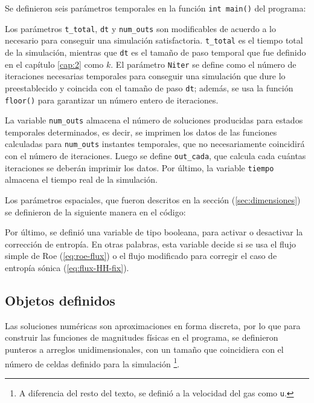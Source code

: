 

Se definieron seis parámetros temporales en la función \texttt{int main()} del programa:


Los parámetros \texttt{t\_total}, \texttt{dt} y \texttt{num\_outs} son modificables de acuerdo a lo necesario para conseguir una simulación satisfactoria. \texttt{t\_total} es el tiempo total de la simulación, mientras que \texttt{dt} es el tamaño de paso temporal que fue definido en el capítulo \ref{cap:2} como $k$. El parámetro \texttt{Niter} se define como el número de iteraciones necesarias temporales para conseguir una simulación que dure lo preestablecido y coincida con el tamaño de paso \texttt{dt}; además, se usa la función \texttt{floor()} para garantizar un número entero de iteraciones. 

La variable \texttt{num\_outs} almacena el número de soluciones producidas para estados temporales determinados, es decir, se imprimen los datos de las funciones calculadas para \texttt{num\_outs} instantes temporales, que no necesariamente coincidirá con el número de iteraciones. Luego se define \texttt{out\_cada}, que calcula cada cuántas iteraciones se deberán imprimir los datos. Por último, la variable \texttt{tiempo} almacena el tiempo real de la simulación.

Los parámetros espaciales, que fueron descritos en la sección (\ref{sec:dimensiones}) se definieron de la siguiente manera en el código:


Por último, se definió una variable de tipo booleana, para activar o desactivar la corrección de entropía. En otras palabras, esta variable decide si se usa el flujo simple de Roe (\ref{eq:roe-flux}) o el flujo modificado para corregir el caso de entropía sónica (\ref{eq:flux-HH-fix}).

\subsection{Objetos definidos}
Las soluciones numéricas son aproximaciones en forma discreta, por lo que para construir las funciones de magnitudes físicas en el programa, se definieron punteros a arreglos unidimensionales, con un tamaño que coincidiera con el número de celdas definido para la simulación \footnote{A diferencia del resto del texto, se definió a la velocidad del gas como \texttt{u}.}.


